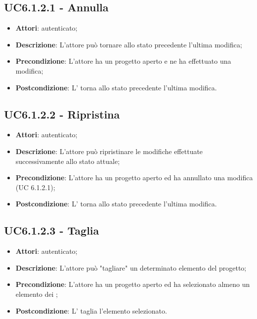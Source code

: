 \subsection{UC6.1.2.1 - Annulla}
\label{ssec:UC6.1.2.1}
\begin{itemize}
\item \textbf{Attori}:  autenticato;
\item \textbf{Descrizione}: L’attore può tornare allo stato precedente l’ultima modifica;
\item \textbf{Precondizione}: L'attore ha un progetto aperto e ne ha effettuato una modifica;
\item \textbf{Postcondizione}: L’ torna allo stato precedente l’ultima modifica.
\end{itemize}
\subsection{UC6.1.2.2 - Ripristina}
\label{ssec:UC6.1.2.2}
\begin{itemize}
\item \textbf{Attori}:  autenticato;
\item \textbf{Descrizione}: L’attore può ripristinare le modifiche effettuate successivamente allo stato attuale;
\item \textbf{Precondizione}: L’attore ha un progetto aperto ed ha annullato una modifica (UC 6.1.2.1);
\item \textbf{Postcondizione}: L’ torna allo stato precedente l’ultima modifica.
\end{itemize}
\subsection{UC6.1.2.3 - Taglia}
\label{ssec:UC6.1.2.3}
\begin{itemize}
\item \textbf{Attori}:  autenticato;
\item \textbf{Descrizione}: L’attore può "tagliare" un determinato elemento del progetto;
\item \textbf{Precondizione}: L’attore ha un progetto aperto ed ha selezionato almeno un elemento dei ;
\item \textbf{Postcondizione}: L’ taglia l’elemento selezionato.
\end{itemize}
